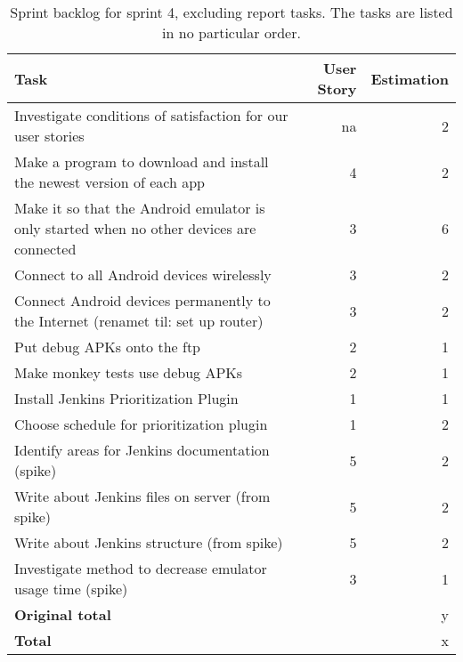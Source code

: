 \begin{table}%
  \centering
  \begin{tabular}{p{}rr}
    \toprule
    \textbf{Task} & \textbf{User Story} & \textbf{Estimation} \\
    \midrule
    Investigate conditions of satisfaction for our user stories & na & 2 \\
    Make a program to download and install the newest version of each app & 4 & 2 \\
    Make it so that the Android emulator is only started when no other devices are connected & 3 & 6 \\
    Connect to all Android devices wirelessly & 3 & 2 \\
    Connect Android devices permanently to the Internet (renamet til: set up router) & 3 & 2 \\
    Put debug APKs onto the ftp & 2 & 1 \\
    Make monkey tests use debug APKs & 2 & 1 \\
    Install Jenkins Prioritization Plugin & 1 & 1 \\
    Choose schedule for prioritization plugin & 1 & 2 \\
    Identify areas for Jenkins documentation (spike) & 5 & 2 \\
    Write about Jenkins files on server (from spike) & 5 & 2 \\
    Write about Jenkins structure (from spike) & 5 & 2 \\
    Investigate method to decrease emulator usage time (spike) & 3 & 1 \\
    \midrule
    \textbf{Original total} & & y \\
    \textbf{Total} & & x \\
    \bottomrule
  \end{tabular}
\caption[Sprint 4 backlog]{Sprint backlog for sprint 4, excluding report tasks. The tasks are listed in no particular order.}
\label{tab:sprint4_tasks}
\end{table}


